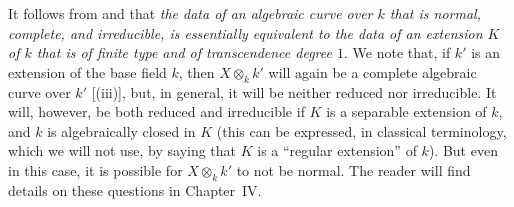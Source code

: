 \begin{remarks}[7.4.19]
\label{II.7.4.19}
It follows from  and  that \emph{the data of an algebraic curve over $k$ that is normal, complete, and irreducible, is essentially equivalent to the data of an extension $K$ of $k$ that is of finite type and of transcendence degree $1$}.
We note that, if $k'$ is an extension of the base field $k$, then $X\otimes_k k'$ will again be a complete algebraic curve over $k'$ [(iii)], but, in general, it will be neither reduced nor irreducible.
It will, however, be both reduced and irreducible if $K$ is a separable extension of $k$, and $k$ is algebraically closed in $K$ (this can be expressed, in classical terminology, which we will not use, by saying that $K$ is a ``regular extension'' of $k$).
But even in this case, it is possible for $X\otimes_k k'$ to not be normal.
The reader will find details on these questions in Chapter~IV.
\end{remarks}
